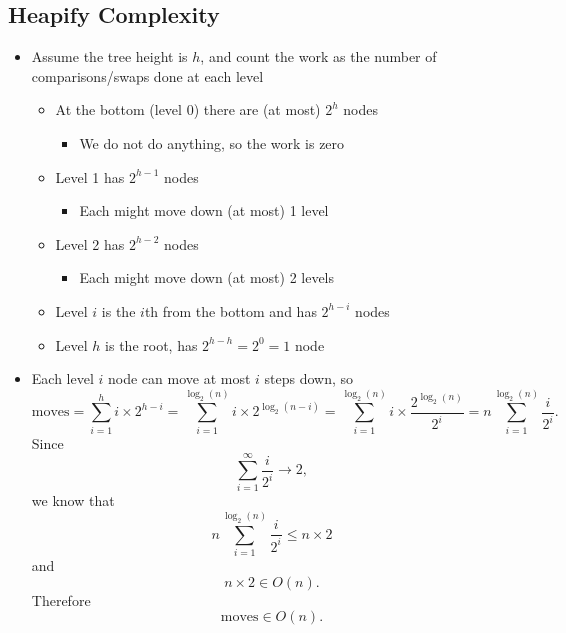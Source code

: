 \documentclass[
  10pt,
  english,
  letterpaper,
,tablecaptionabove
]{scrartcl}
\providecommand{\tightlist}{%
  \setlength{\itemsep}{0pt}\setlength{\parskip}{0pt}}
\begin{document}
\hypertarget{heapify-complexity}{%
\subsection{Heapify Complexity}\label{heapify-complexity}}

\begin{itemize}
\tightlist
\item
  Assume the tree height is \(h\), and count the work as the number of
  comparisons/swaps done at each level

  \begin{itemize}
  \tightlist
  \item
    At the bottom (level 0) there are (at most) \(2^h\) nodes

    \begin{itemize}
    \tightlist
    \item
      We do not do anything, so the work is zero
    \end{itemize}
  \item
    Level 1 has \(2^{h-1}\) nodes

    \begin{itemize}
    \tightlist
    \item
      Each might move down (at most) 1 level
    \end{itemize}
  \item
    Level 2 has \(2^{h-2}\) nodes

    \begin{itemize}
    \tightlist
    \item
      Each might move down (at most) 2 levels
    \end{itemize}
  \item
    Level \(i\) is the \(i\)th from the bottom and has \(2^{h-i}\) nodes
  \item
    Level \(h\) is the root, has \(2^{h-h} = 2^0 = 1\) node
  \end{itemize}
\item
  Each level \(i\) node can move at most \(i\) steps down, so
  \[\text{moves} = \sum_{i=1}^h i\times 2^{h-i} = \sum_{i=1}^{\log_2(n)} i\times 2^{\log_2(n-i)} = \sum_{i=1}^{\log_2(n)} i\times \frac{2^{\log_2(n)}}{2^i} = n \sum_{i=1}^{\log_2(n)} \frac{i}{2^i}.\]
  Since \[\sum_{i=1}^\infty \frac{i}{2^i} \rightarrow 2,\] we know that
  \[n \sum_{i=1}^{\log_2(n)} \frac{i}{2^i} \leq n\times 2\] and
  \[n\times 2 \in O(n).\] Therefore \[\text{moves} \in O(n).\]
\end{itemize}
\end{document}
